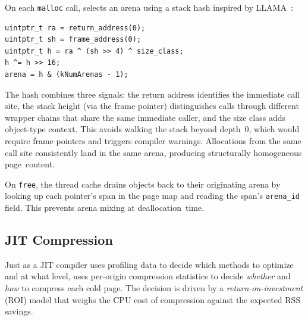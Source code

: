 On each \texttt{malloc} call, \sys selects an arena using a
stack hash inspired by LLAMA~\cite{maas2020adaptive}:

\begin{lstlisting}
uintptr_t ra = return_address(0);
uintptr_t sh = frame_address(0);
uintptr_t h = ra ^ (sh >> 4) ^ size_class;
h ^= h >> 16;
arena = h & (kNumArenas - 1);
\end{lstlisting}

The hash combines three signals: the return address identifies the
immediate call site, the stack height (via the frame pointer)
distinguishes calls through different wrapper chains that share the
same immediate caller, and the size class adds object-type context.
This avoids walking the stack beyond depth~0, which would require
frame pointers and triggers compiler warnings.
Allocations from the same call site consistently land in the same
arena, producing structurally homogeneous page~content.

On \texttt{free}, the thread cache drains objects back to their
originating arena by looking up each pointer's span in the page map
and reading the span's \texttt{arena\_id} field.  This prevents arena mixing at deallocation~time.

\subsection{JIT Compression}
\label{sec:design:adaptive}

Just as a JIT compiler uses profiling data to decide which methods to
optimize and at what level, \sys uses per-origin compression
statistics to decide \emph{whether} and \emph{how} to compress each
cold page.  The decision is driven by a \emph{return-on-investment}
(ROI) model that weighs the CPU cost of compression against the
expected RSS savings.

